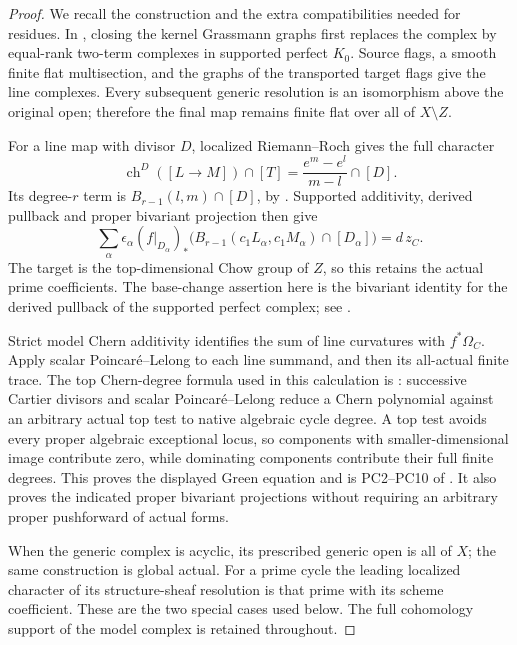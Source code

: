 \documentclass[11pt,a4paper]{article}
\theoremstyle{definition}
\theoremstyle{remark}
\numberwithin{equation}{section}
\begin{document}
\begin{proof}
We recall the construction and the extra compatibilities needed for residues. In \cite[Lemma \texttt{r11p:relative-lines}]{GC}, closing the kernel Grassmann graphs first replaces the complex by equal-rank two-term complexes in supported perfect $K_0$. Source flags, a smooth finite flat multisection, and the graphs of the transported target flags give the line complexes. Every subsequent generic resolution is an isomorphism above the original open; therefore the final map remains finite flat over all of $X\setminus Z$.

For a line map with divisor $D$, localized Riemann--Roch gives the full character
\[
 \operatorname{ch}^{D}([L\to M])\cap[T]
       =\frac{e^m-e^l}{m-l}\cap[D].
\]
Its degree-$r$ term is $B_{r-1}(l,m)\cap[D]$, by \cite[Corollary 18.1.2]{Fulton}. Supported additivity, derived pullback and proper bivariant projection then give
\[
 \sum_\alpha\epsilon_\alpha(f|_{D_\alpha})_*
       \bigl(B_{r-1}(c_1L_\alpha,c_1M_\alpha)\cap[D_\alpha]\bigr)
             =d\,z_C.
\]
The target is the top-dimensional Chow group of $Z$, so this retains the actual prime coefficients. The base-change assertion here is the bivariant identity for the derived pullback of the supported perfect complex; see \cite[Tags 0FB3, 0FBE and 0FET]{Stacks}.

Strict model Chern additivity identifies the sum of line curvatures with $f^*\Omega_C$. Apply scalar Poincar\'e--Lelong to each line summand, and then its all-actual finite trace. The top Chern-degree formula used in this calculation is \cite[Lemma \texttt{r11p:proper-chern-degree}]{GC}: successive Cartier divisors and scalar Poincar\'e--Lelong reduce a Chern polynomial against an arbitrary actual top test to native algebraic cycle degree. A top test avoids every proper algebraic exceptional locus, so components with smaller-dimensional image contribute zero, while dominating components contribute their full finite degrees. This proves the displayed Green equation and is PC2--PC10 of \cite{GC}. It also proves the indicated proper bivariant projections without requiring an arbitrary proper pushforward of actual forms.

When the generic complex is acyclic, its prescribed generic open is all of $X$; the same construction is global actual. For a prime cycle the leading localized character of its structure-sheaf resolution is that prime with its scheme coefficient. These are the two special cases used below. The full cohomology support of the model complex is retained throughout.
\end{proof}
\end{document}
